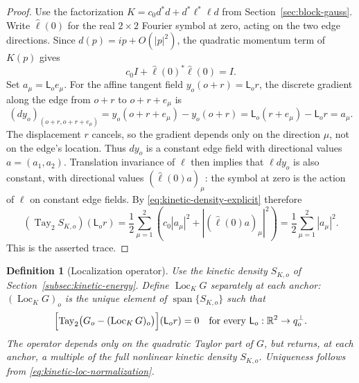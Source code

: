 \documentclass[11pt]{article}
\newcommand{\R}{\mathbb R}
\newcommand{\Tay}{\operatorname{Tay}}
\newcommand{\Loc}{\operatorname{Loc}}
\numberwithin{equation}{section}
\newtheorem{definition}[theorem]{Definition}
\theoremstyle{definition}
\theoremstyle{plain}
\begin{document}
\begin{proof}
Use the factorization $K=c_0d^*d+d^*\ell^*\ell d$ from
Section~\ref{sec:block-gauss}.  Write $\widehat\ell(0)$ for the
real $2\times2$ Fourier symbol at zero, acting on the two edge
directions.  Since $d(p)=ip+O(|p|^2)$, the quadratic momentum
term of $K(p)$ gives
\begin{equation}
 c_0 I+\widehat\ell(0)^*\widehat\ell(0)=I.
\end{equation}
Set $a_\mu=\mathsf L_o e_\mu$.  For the affine tangent field
$y_o(o+r)=\mathsf L_o r$, the discrete gradient along the edge
from $o+r$ to $o+r+e_\mu$ is
\begin{equation}
 (dy_o)_{(o+r,o+r+e_\mu)}
 =y_o(o+r+e_\mu)-y_o(o+r)
 =\mathsf L_o(r+e_\mu)-\mathsf L_o r
 =a_\mu.
\end{equation}
The displacement $r$ cancels, so the gradient depends only on
the direction $\mu$, not on the edge's location.
Thus $dy_o$ is a constant edge field with directional values
$a=(a_1,a_2)$.  Translation invariance of $\ell$ then implies
that $\ell dy_o$ is also constant, with directional values
$(\widehat\ell(0)a)_\mu$: the symbol at zero is the action of
$\ell$ on constant edge fields.
%
By \eqref{eq:kinetic-density-explicit} therefore
\begin{equation}
 (\Tay_2 S_{K,o})(\mathsf L_o r)
 =\frac12\sum_{\mu=1}^2
       \left(c_0|a_\mu|^2+|(\widehat\ell(0)a)_\mu|^2\right)
 =\frac12\sum_{\mu=1}^2|a_\mu|^2.
\end{equation}
This is the asserted trace.  
\end{proof}


\begin{definition}[Localization operator]
\label{def:kinetic-loc}
Use the kinetic density $S_{K,o}$ of
Section~\ref{subsec:kinetic-energy}.
Define $\Loc_K G$ separately at
each anchor: $(\Loc_K G)_o$ is the unique element of
$\operatorname{span}\{S_{K,o}\}$ such that
\begin{equation}
 \Bigl[\Tay_2\bigl(G_o-(\Loc_{K}G)_o\bigr)\Bigr]
                      (\mathsf L_o r)=0
 \quad\text{for every }\mathsf L_o:\R^2\to q_o^\perp.
 \label{eq:kinetic-loc-matching}
\end{equation}
The operator depends only on the quadratic Taylor part of $G$, but
returns, at each anchor, a multiple of the full nonlinear
kinetic density $S_{K,o}$.
Uniqueness follows from \eqref{eq:kinetic-loc-normalization}.
\end{definition}
\end{document}
